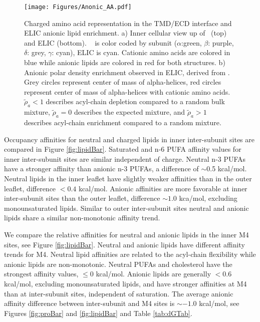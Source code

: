 \begin{figure}[!h]
	\center
	\texttt{[image: Figures/Anonic\_AA.pdf]}
	\caption[Charged amino acid representation in the TMD/ECD interface and ELIC anionic enrichment.] {Charged amino acid representation in the TMD/ECD interface and ELIC anionic lipid enrichment. a) Inner cellular view up of \nachr~(top) and ELIC (bottom). \nachr~ is color coded by subunit ($\alpha$:green, $\beta$: purple, $\delta$: grey, $\gamma$: cyan), ELIC is cyan. Cationic amino acids are colored in blue while anionic lipids are colored in red for both structures. b) Anionic polar density enrichment observed in ELIC, derived from \cite{Tong2019}. Grey circles represent center of mass of alpha-helices, red circles represent center of mass of alpha-helices with cationic amino acids. $\tilde{\rho}_{a}< 1$ describes acyl-chain depletion compared to a random bulk mixture, $\tilde{\rho}_{a}=0$ describes the expected mixture, and $\tilde{\rho}_{a}  > 1$ describes acyl-chain enrichment compared to a random mixture.}
	\label{fig:aaa}
\end{figure}

Occupancy affinities for neutral and charged lipids in inner inter-subunit sites are compared in Figure \ref{fig:lipidBar}. Saturated and n-6 PUFA affinity values for inner inter-subunit sites are similar independent of charge. Neutral n-3 PUFAs have a stronger affinity than anionic n-3 PUFAs, a difference of $\sim$0.5 kcal/mol. Neutral lipids in the inner leaflet have slightly weaker affinities than in the outer leaflet, difference $< 0.4$ kcal/mol. Anionic affinities are more favorable at inner inter-subunit sites than the outer leaflet, difference $\sim1.0$ kca/mol, excluding monounsaturated lipids. Similar to outer inter-subunit sites neutral and anionic lipids share a similar non-monotonic affinity trend.%

We compare the relative affinities for neutral and anionic lipids in the inner M4 sites, see Figure \ref{fig:lipidBar}. Neutral and anionic lipids have different affinity trends for M4. Neutral lipid affinities are related to the acyl-chain flexibility while anionic lipids are non-monotonic. Neutral PUFAs and cholesterol have the strongest affinity values, $\leq 0$ kcal/mol.  Anionic lipids are generally $<0.6$ kcal/mol, excluding monounsaturated lipids, and have stronger affinities at M4 than at inter-subunit sites, independent of saturation. The average anionic affinity difference between inter-subunit and M4 sites is $\sim -1.0$ kcal/mol, see Figures \ref{fig:proBar} and \ref{fig:lipidBar} and Table \ref{tab:dGTab}. 

